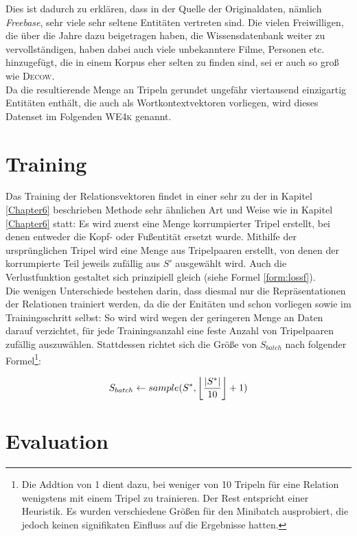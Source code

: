 Dies ist dadurch zu erklären, dass in der Quelle der Originaldaten, nämlich \emph{Freebase},
sehr viele sehr seltene Entitäten vertreten sind. Die vielen Freiwilligen, die über die
Jahre dazu beigetragen haben, die Wissensdatenbank weiter zu vervollständigen, haben dabei auch
viele unbekanntere Filme, Personen etc. hinzugefügt, die in einem Korpus eher selten zu finden sind, sei er auch
so groß wie \textsc{Decow}.\\

Da die resultierende Menge an Tripeln gerundet ungefähr viertausend einzigartig Entitäten enthält, die auch als
Wortkontextvektoren vorliegen, wird dieses Datenset im Folgenden \textsc{WE4k} genannt.

\section{Training}

Das Training der Relationsvektoren findet in einer sehr zu der in Kapitel \ref{Chapter6} beschrieben Methode sehr
ähnlichen Art und Weise wie in Kapitel \ref{Chapter6} statt: Es wird zuerst eine Menge korrumpierter Tripel erstellt, bei denen entweder
die Kopf- oder Fußentität ersetzt wurde.
Mithilfe der ursprünglichen Tripel wird eine Menge aus Tripelpaaren erstellt, von denen der korrumpierte Teil jeweils
zufällig aus $S'$ ausgewählt wird. Auch die Verlustfunktion gestaltet sich prinzipiell gleich (siehe Formel \ref{form:lossf}).\\

Die wenigen Unterschiede bestehen darin, dass diesmal nur die Repräsentationen der Relationen trainiert werden,
da die der Enitäten und schon vorliegen sowie im Trainingsschritt selbst: So wird wird wegen der geringeren Menge an
Daten darauf verzichtet, für jede Trainingsanzahl eine feste Anzahl von Tripelpaaren zufällig auszuwählen.
Stattdessen richtet sich die Größe von $S_{batch}$ nach folgender Formel\footnote{Die Addtion von 1 dient dazu, bei weniger
von 10 Tripeln für eine Relation wenigstens mit einem Tripel zu trainieren. Der Rest entspricht einer Heuristik. Es wurden
verschiedene Größen für den Minibatch ausprobiert, die jedoch keinen signifikaten Einfluss auf die Ergebnisse hatten.}:

\begin{equation}
  S_{batch} \leftarrow sample(S^*, \floor*{\frac{|S^*|}{10}}+1)
\end{equation}

\section{Evaluation}

